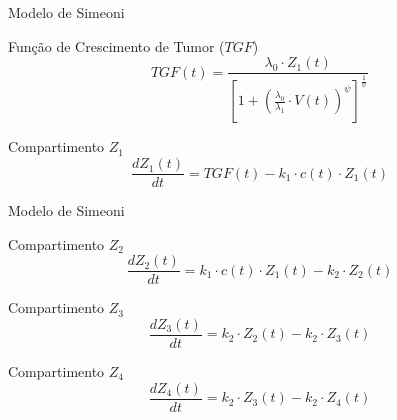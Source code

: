 \documentclass{beamer}
\begin{document}
\begin{frame}{Modelo de Simeoni}
    
    \begin{block}{Função de Crescimento de Tumor (\(TGF\))}
        \begin{equation*}
            TGF(t) = \frac{\lambda_0 \cdot Z_1(t)}{\left[1 + \left(\frac{\lambda_0}{\lambda_1} \cdot V(t)\right)^\psi\right]^{\frac{1}{\psi}}}
        \end{equation*}
    \end{block}
    
    \begin{block}{Compartimento \(Z_1\)}
        \begin{equation*}
            \frac{dZ_1(t)}{dt} = TGF(t) - k_1 \cdot c(t) \cdot Z_1(t)
        \end{equation*}
    \end{block}
    
\end{frame}

\begin{frame}{Modelo de Simeoni}

    \begin{block}{Compartimento \(Z_2\)}
        \begin{equation*}
            \frac{dZ_2(t)}{dt} = k_1 \cdot c(t) \cdot Z_1(t) - k_2 \cdot Z_2(t)
        \end{equation*}
    \end{block}

    \begin{block}{Compartimento \(Z_3\)}
        \begin{equation*}
            \frac{dZ_3(t)}{dt} = k_2 \cdot Z_2(t) - k_2 \cdot Z_3(t)
        \end{equation*}
    \end{block}

    \begin{block}{Compartimento \(Z_4\)}
        \begin{equation*}
            \frac{dZ_4(t)}{dt} = k_2 \cdot Z_3(t) - k_2 \cdot Z_4(t)
        \end{equation*}
    \end{block}
    
\end{frame}
\end{document}
